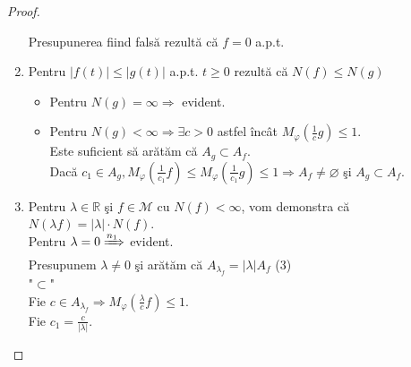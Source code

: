 \documentclass[ a4paper, 12pt]{report}
\theoremstyle{definition}
\theoremstyle{remark}
\numberwithin{equation}{section}
\begin{document}
\begin{proof}
\begin{enumerate}[($n_1$)]
Presupunerea fiind fals\u a  rezult\u a c\u a $f =0$ a.p.t.
\item Pentru $\lvert f(t) \rvert \leq \lvert g(t) \rvert$ a.p.t. $t \geq 0$ rezult\u a c\u a $N(f) \leq N(g)$\\
\begin{itemize}
\item Pentru $N(g) = \infty \Rightarrow$ evident.\\
\item Pentru  $N(g) < \infty \Rightarrow \exists c >0$ astfel \^inc\^at $M_\varphi (\frac{1}{c} g) \leq 1.$\\
Este suficient s\u a ar\u at\u am c\u a $A_g \subset A_f$.\\Dac\u a $c_1 \in A_g,  M_\varphi(\frac{1}{c_1}f) \leq M_\varphi(\frac{1}{c_1}g) \leq 1 \Rightarrow A_f \neq \varnothing$ \c si $A_g \subset A_f$.\\
\end{itemize}
\newpage
\item Pentru $\lambda \in \mathbb{R}$ \c si $f \in \mathcal{M}$ cu $N(f) < \infty$, vom demonstra c\u a $N(\lambda f) = \lvert \lambda \rvert\cdot N(f)$.\\
Pentru $\lambda = 0 \xRightarrow{n_1}$ evident.\\
Presupunem $\lambda \neq 0$ \c si ar\u at\u am c\u a $A_{\lambda_f} = \lvert \lambda \rvert A_f$\hspace{40mm} (3)\\
\vspace{3mm}"$\subset$"\\
Fie $c \in A_{\lambda_f} \Rightarrow M_\varphi\left (\frac{\lambda}{c}f \right ) \leq 1.$\\
Fie $c_1 = \frac{c}{\lvert \lambda \rvert}.$\\


\end{enumerate}
\end{proof}
\end{document}
